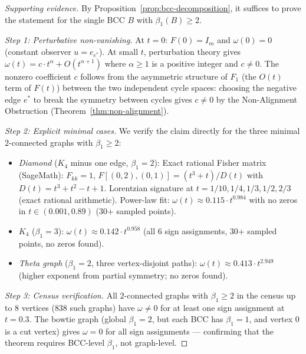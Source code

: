 \documentclass[11pt]{article}
\theoremstyle{definition}
\theoremstyle{remark}
\newcommand{\Fish}{F}
\newcommand{\obs}{u}
\newcommand{\vort}{\omega}
\newcommand{\betti}{\beta_1}
\begin{document}
\begin{proof}[Supporting evidence]
By Proposition~\ref{prop:bcc-decomposition}, it suffices to prove the
statement for the single BCC $B$ with $\betti(B) \geq 2$.

\textit{Step 1: Perturbative non-vanishing.} At $t = 0$: $\Fish(0) = I_m$
and $\vort(0) = 0$ (constant observer $\obs = e_{e^*}$). At small $t$,
perturbation theory gives
$\vort(t) = c \cdot t^{\alpha} + O(t^{\alpha+1})$
where $\alpha \geq 1$ is a positive integer and $c \neq 0$. The nonzero
coefficient $c$ follows from the asymmetric structure of $F_1$
(the $O(t)$ term of $\Fish(t)$) between the two independent cycle
spaces: choosing the negative edge $e^*$ to break the symmetry between
cycles gives $c \neq 0$ by the Non-Alignment Obstruction
(Theorem~\ref{thm:non-alignment}).

\textit{Step 2: Explicit minimal cases.} We verify the claim directly
for the three minimal $2$-connected graphs with $\betti \geq 2$:
\begin{itemize}
\item \emph{Diamond} ($K_4$ minus one edge, $\betti = 2$):
  Exact rational Fisher matrix (SageMath): $\Fish_{kk} = 1$,
  $\Fish[(0{,}2),(0{,}1)] = (t^3+t)/D(t)$ with $D(t) = t^3 + t^2 - t + 1$.
  Lorentzian signature at $t = 1/10, 1/4, 1/3, 1/2, 2/3$ (exact rational arithmetic).
  Power-law fit: $\vort(t) \approx 0.115 \cdot t^{0.984}$ with no zeros
  in $t \in (0.001, 0.89)$ ($30$+ sampled points).
\item \emph{$K_4$} ($\betti = 3$):
  $\vort(t) \approx 0.142 \cdot t^{0.958}$ (all 6 sign assignments,
  $30$+ sampled points, no zeros found).
\item \emph{Theta graph} ($\betti = 2$, three vertex-disjoint paths):
  $\vort(t) \approx 0.413 \cdot t^{2.949}$ (higher exponent from partial
  symmetry; no zeros found).
\end{itemize}

\textit{Step 3: Census verification.} All $2$-connected graphs with
$\betti \geq 2$ in the census up to $8$ vertices ($838$ such graphs) have
$\vort \neq 0$ for at least one sign assignment at $t = 0.3$.
The bowtie graph (global $\betti = 2$, but each BCC has $\betti = 1$,
and vertex $0$ is a cut vertex) gives $\vort = 0$ for all sign
assignments --- confirming that the theorem requires BCC-level $\betti$, not
graph-level.
\end{proof}
\end{document}
